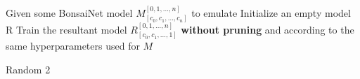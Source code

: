 \begin{algorithm}[ht]
\SetAlgoLined
Given some BonsaiNet model $M^{[0,1,\dots,{n}]}_{[c_0,c_1,\dots,c_{n}]}$ to emulate\;
Initialize an empty model R\;
\BlankLine
{}
Train the resultant model $R^{[0,1,\dots,n]}_{[c_0,c_1,\dots,1]}$ \textbf{without pruning} and according to the same hyperparameters used for $M$\;
\caption{Random 2}
\label{alg:bonsai_r2}
\end{algorithm}
